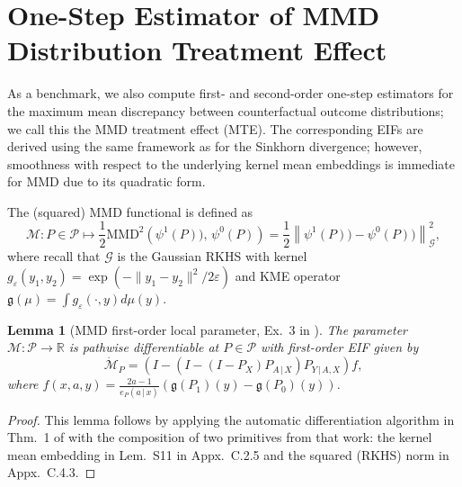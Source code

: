\documentclass{article}
\theoremstyle{plain}
\newtheorem{lemma}[theorem]{Lemma}
\theoremstyle{definition}
\theoremstyle{remark}
\newcommand{\R}{\mathbb{R}}
\newcommand{\of}[1]{\left(#1\right)}
\newcommand{\cP}{\mathcal{P}}
\newcommand{\cG}{\mathcal{G}}
\newcommand{\ucM}{\mathscr{M}}
\newcommand{\1}{\mathbbm{1}}
\newcommand{\MMD}[3]{\text{MMD}^{#1}\of{#2,\, #3}}
\newcommand{\eps}{\varepsilon}
\newcommand{\norm}[1]{\left \| #1 \right \|}
\theoremstyle{plain}
\theoremstyle{definition}
\newcommand{\mymid}{\,|\,}
\begin{document}
\section{One-Step Estimator of MMD Distribution Treatment Effect}\label{appendix:MMD_DTE}

As a benchmark, we also compute first- and second-order one-step estimators for the maximum mean discrepancy between counterfactual outcome distributions; we call this the MMD treatment effect (MTE). The corresponding EIFs are derived using the same framework as for the Sinkhorn divergence; however, smoothness with respect to the underlying kernel mean embeddings is immediate for MMD due to its quadratic form. 

The (squared) MMD functional is defined as 
\begin{equation}
    \ucM: P \in \cP \mapsto \frac{1}{2}\MMD{2}{\psi^1(P))}{\psi^0(P)} = \frac{1}{2}\norm{\psi^1(P)) - \psi^0(P))}^2_\cG,
\end{equation}
where recall that $\cG$ is the Gaussian RKHS with kernel $g_\eps(y_1, y_2) = \exp(- \|y_1-y_2\|^2/2\eps)$ and KME operator $\mathfrak{g}(\mu) = \int g_\eps(\cdot, y) d\mu(y)$.

\begin{lemma}[MMD first-order local parameter, Ex.~3 in \citet{luedtke2024one}]\label{lem:MMD_first_order_EIF}
    The parameter $\ucM: \cP \to \R$ is pathwise differentiable at $P \in \cP$ with first-order EIF given by
    \[
    \dot{\ucM}_P = (I - (I - (I - P_X)P_{A \mymid X}) P_{Y \mymid A, X}) f,
    \]
    where $f(x,a,y) = \frac{2a-1}{e_P(a \mymid x)} \of{\mathfrak{g}(P_1)(y) - \mathfrak{g}(P_0)(y)}$.
\end{lemma}
\begin{proof}
    This lemma follows by applying the automatic differentiation algorithm in Thm.~1 of \citet{luedtke2026simplifying} with the composition of two primitives from that work: the kernel mean embedding in Lem.~S11 in Appx.~C.2.5 and the squared (RKHS) norm in Appx.~C.4.3.
\end{proof}
\end{document}
